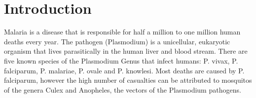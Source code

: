 \section{Introduction}
Malaria is a disease that is responsible for half a million to one million human deaths every year. The pathogen (Plasmodium) is a unicellular, eukaryotic organism that lives parasitically in the human liver and blood stream. There are five known species of the Plasmodium Genus that infect humans: P. vivax, P. falciparum, P. malariae, P. ovale and P. knowlesi. Most deaths are caused by P. falciparum, however the high number of casualties can be attributed to mosquitos of the genera Culex and Anopheles, the vectors of the Plasmodium pathogens. 